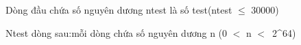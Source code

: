 Dòng đầu chứa số nguyên dương ntest là số test(ntest $\le$ 30000)

Ntest dòng sau:mỗi dòng chứa số nguyên dương n (0 $<$ n $<$ 2^64)